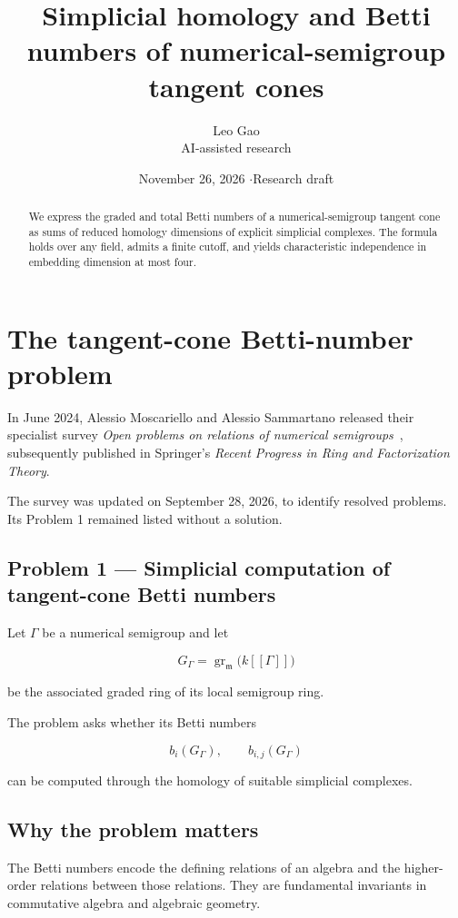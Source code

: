 \documentclass[11pt]{article}
\title{Simplicial homology and Betti numbers of numerical-semigroup tangent cones}
\author{Leo Gao\\[-1pt]{\small AI-assisted research}}
\date{November 26, 2026 \quad$\cdot$\quad Research draft}
\begin{document}
\maketitle
\begin{abstract}
We express the graded and total Betti numbers of a numerical-semigroup tangent cone as sums of reduced homology dimensions of explicit simplicial complexes. The formula holds over any field, admits a finite cutoff, and yields characteristic independence in embedding dimension at most four.
\end{abstract}
\section{The tangent-cone Betti-number problem}

In June 2024, Alessio Moscariello and Alessio Sammartano released their specialist survey \emph{Open problems on relations of numerical semigroups}~\cite{MS}, subsequently published in Springer's \emph{Recent Progress in Ring and Factorization Theory}.

The survey was updated on September 28, 2026, to identify resolved problems. Its Problem 1 remained listed without a solution.

\subsection{Problem 1 --- Simplicial computation of tangent-cone Betti numbers}

Let \(\Gamma\) be a numerical semigroup and let

\[
G_\Gamma=\operatorname{gr}_{\mathfrak m}
\bigl(k[[\Gamma]]\bigr)
\]

be the associated graded ring of its local semigroup ring.

The problem asks whether its Betti numbers

\[
b_i(G_\Gamma),\qquad b_{i,j}(G_\Gamma)
\]

can be computed through the homology of suitable simplicial complexes.

\subsection{Why the problem matters}

The Betti numbers encode the defining relations of an algebra and the higher-order relations between those relations. They are fundamental invariants in commutative algebra and algebraic geometry.
\end{document}
